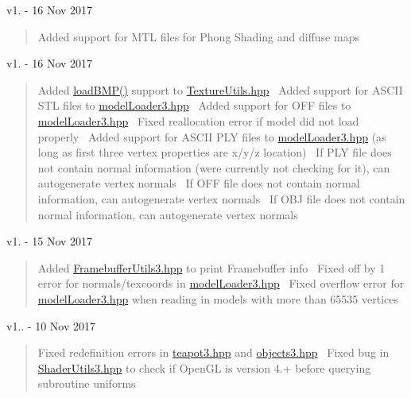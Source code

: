 v1. -\/ 16 Nov 2017 \begin{quote}
Added support for M\+TL files for Phong Shading and diffuse maps \end{quote}


v1. -\/ 16 Nov 2017 \begin{quote}
Added \hyperlink{_texture_utils_8hpp_a7f58e6db7faf86181d593d3afb1a55d7}{load\+B\+M\+P()} support to \hyperlink{_texture_utils_8hpp}{Texture\+Utils.\+hpp}~\newline
Added support for A\+S\+C\+II S\+TL files to \hyperlink{model_loader3_8hpp}{model\+Loader3.\+hpp}~\newline
Added support for O\+FF files to \hyperlink{model_loader3_8hpp}{model\+Loader3.\+hpp}~\newline
Fixed reallocation error if model did not load properly~\newline
Added support for A\+S\+C\+II P\+LY files to \hyperlink{model_loader3_8hpp}{model\+Loader3.\+hpp} (as long as first three vertex properties are x/y/z location)~\newline
If P\+LY file does not contain normal information (we\textquotesingle{}re currently not checking for it), can autogenerate vertex normals~\newline
If O\+FF file does not contain normal information, can autogenerate vertex normals~\newline
If O\+BJ file does not contain normal information, can autogenerate vertex normals \end{quote}


v1. -\/ 15 Nov 2017 \begin{quote}
Added \hyperlink{_framebuffer_utils3_8hpp}{Framebuffer\+Utils3.\+hpp} to print Framebuffer info~\newline
Fixed off by 1 error for normals/texcoords in \hyperlink{model_loader3_8hpp}{model\+Loader3.\+hpp}~\newline
Fixed overflow error for \hyperlink{model_loader3_8hpp}{model\+Loader3.\+hpp} when reading in models with more than 65535 vertices \end{quote}


v1.. -\/ 10 Nov 2017 \begin{quote}
Fixed redefinition errors in \hyperlink{teapot3_8hpp}{teapot3.\+hpp} and \hyperlink{objects3_8hpp}{objects3.\+hpp}~\newline
Fixed bug in \hyperlink{_shader_utils3_8hpp}{Shader\+Utils3.\+hpp} to check if Open\+GL is version 4.+ before querying subroutine uniforms \end{quote}


